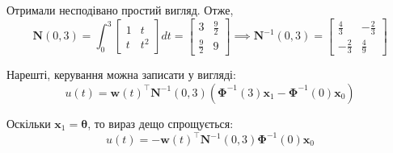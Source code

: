 \documentclass[oneside,solution]{karazin-control-assign}
\begin{document}
Отримали несподівано простий вигляд. Отже,
\begin{equation}
    \boldsymbol{N}(0,3) = \int_0^3 \begin{bmatrix}
        1 & t \\ t & t^2
    \end{bmatrix}dt = \begin{bmatrix}
        3 & \frac{9}{2} \\ \frac{9}{2} & 9
    \end{bmatrix} \implies \boldsymbol{N}^{-1}(0,3) = \begin{bmatrix}
        \frac{4}{3} & -\frac{2}{3} \\ -\frac{2}{3} & \frac{4}{9}
    \end{bmatrix}
\end{equation}

Нарешті, керування можна записати у вигляді:
\begin{equation}
    u(t) = \mathbf{w}(t)^{\top}\boldsymbol{N}^{-1}(0,3)\left(\boldsymbol{\Phi}^{-1}(3)\mathbf{x}_1 - \boldsymbol{\Phi}^{-1}(0)\mathbf{x}_0\right)
\end{equation}

Оскільки $\mathbf{x}_1 = \boldsymbol{\theta}$, то вираз дещо спрощується:
\begin{equation}
    u(t) = -\mathbf{w}(t)^{\top}\boldsymbol{N}^{-1}(0,3)\boldsymbol{\Phi}^{-1}(0)\mathbf{x}_0
\end{equation}
\end{document}
